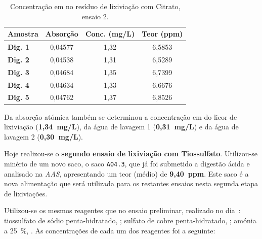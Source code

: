 \begin{table}[!ht]
    \centering
    \begin{tabularx}{\textwidth}{@{}lCCC@{}}
        \toprule
        \textbf{Amostra} & \textbf{Absorção} & \textbf{Conc. (mg/L)} & \textbf{Teor  (ppm)} \\ \midrule
        \textbf{Dig. 1} & 0,04577 & 1,32 & 6,5853 \\
        \textbf{Dig. 2} & 0,04538 & 1,31 & 6,5289 \\
        \textbf{Dig. 3} & 0,04684 & 1,35 & 6,7399 \\
        \textbf{Dig. 4} & 0,04634 & 1,33 & 6,6676 \\
        \textbf{Dig. 5} & 0,04762 & 1,37 & 6,8526 \\ \bottomrule
    \end{tabularx}
    \caption{Concentração em  no resíduo de lixiviação com Citrato, ensaio 2.}
    \label{tab:aas-concentracao-au-res-citrato2}
\end{table}

Da absorção atómica também se determinou a concentração em  do licor de lixiviação (\textbf{1,34~mg/L}), da água de lavagem 1 (\textbf{0,31~mg/L}) e da água de lavagem 2 (\textbf{0,30~mg/L}).

\hrulefill

\label{day:9-janeiro-2025}

Hoje realizou-se o \textbf{segundo ensaio de lixiviação com Tiossulfato}.
Utilizou-se minério de um novo saco, o saco \texttt{A04.3}, que já foi submetido a digestão ácida e analisado na \emph{AAS}, apresentando um teor (médio) de \textbf{9,40~ppm}.
Este saco é a nova alimentação que será utilizada para os restantes ensaios nesta segunda etapa de lixiviações.


Utilizou-se os mesmos reagentes que no ensaio preliminar, realizado no dia~: tiossulfato de sódio penta-hidratado, \tsp{}; sulfato de cobre penta-hidratado, \sulfcu{}; amónia a 25~\%, \amo{}.
As concentrações de cada um dos reagentes foi a seguinte:

